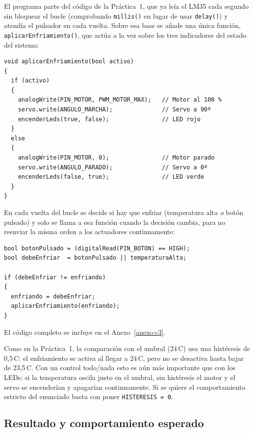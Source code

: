 \documentclass{upo-master}
\begin{document}
El programa parte del código de la Práctica~1, que ya leía el LM35 cada
segundo sin bloquear el bucle (comprobando \texttt{millis()} en lugar de usar
\texttt{delay()}) y atendía el pulsador en cada vuelta. Sobre esa base se
añade una única función, \texttt{aplicarEnfriamiento()}, que actúa a la vez
sobre los tres indicadores del estado del sistema:

\begin{lstlisting}[style=arduino, caption={Activación y desactivación del sistema de enfriamiento.}]
void aplicarEnfriamiento(bool activo)
{
  if (activo)
  {
    analogWrite(PIN_MOTOR, PWM_MOTOR_MAX);   // Motor al 100 %
    servo.write(ANGULO_MARCHA);              // Servo a 90º
    encenderLeds(true, false);               // LED rojo
  }
  else
  {
    analogWrite(PIN_MOTOR, 0);               // Motor parado
    servo.write(ANGULO_PARADO);              // Servo a 0º
    encenderLeds(false, true);               // LED verde
  }
}
\end{lstlisting}

En cada vuelta del bucle se decide si hay que enfriar (temperatura alta
\emph{o} botón pulsado) y solo se llama a esa función cuando la decisión
cambia, para no reenviar la misma orden a los actuadores continuamente:

\begin{lstlisting}[style=arduino, caption={Decisión de control en \texttt{loop()}.}]
bool botonPulsado = (digitalRead(PIN_BOTON) == HIGH);
bool debeEnfriar  = botonPulsado || temperaturaAlta;

if (debeEnfriar != enfriando)
{
  enfriando = debeEnfriar;
  aplicarEnfriamiento(enfriando);
}
\end{lstlisting}

El código completo se incluye en el Anexo~\ref{anexo:c3}.

\begin{nota}[Histéresis]
Como en la Práctica~1, la comparación con el umbral (24\,\textdegree C) usa
una histéresis de 0,5\,\textdegree C: el enfriamiento se activa al llegar a
24\,\textdegree C, pero no se desactiva hasta bajar de 23,5\,\textdegree C.
Con un control todo/nada esto es aún más importante que con los LEDs: si la
temperatura oscila justo en el umbral, sin histéresis el motor y el servo se
encenderían y apagarían continuamente. Si se quiere el comportamiento estricto
del enunciado basta con poner \texttt{HISTERESIS = 0}.
\end{nota}

\subsection{Resultado y comportamiento esperado}
\end{document}

